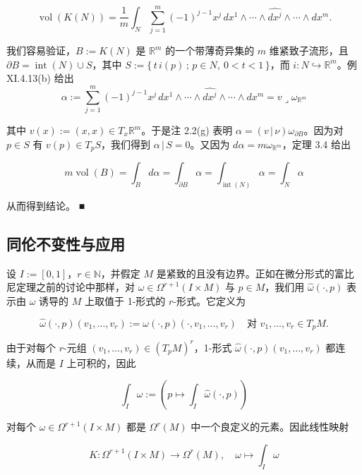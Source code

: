 \begin{example}
\begin{items}
\[
\operatorname{vol}(K(N)) = \frac{1}{m}\int_{N}\sum_{j=1}^{m}(-1)^{j-1}x^{j}\,dx^{1}\wedge\cdots\wedge\widehat{dx^{j}}\wedge\cdots\wedge dx^{m}.
\]

\proofhead
我们容易验证，$ B := K(N) $ 是 $ \mathbb{R}^m $ 的一个带薄奇异集的 $ m $ 维紧致子流形，且 $ \partial B = \operatorname{int}(N)\cup S $，其中 $ S := \{\,t\,i(p) \,;\, p\in N,\ 0 < t < 1\,\} $，而 $ i: N\hookrightarrow\mathbb{R}^m $。例 XI.4.13(b) 给出
\[
\alpha := \sum_{j=1}^{m}(-1)^{j-1}x^{j}\,dx^{1}\wedge\cdots\wedge\widehat{dx^{j}}\wedge\cdots\wedge dx^{m} = v\lrcorner\omega_{\mathbb{R}^m}
\]

其中 $ v(x) := (x,x)\in T_x\mathbb{R}^m $。于是注 2.2(g) 表明 $ \alpha = (v\,|\,\nu)\omega_{\partial B} $。因为对 $ p\in S $ 有 $ v(p)\in T_p S $，我们得到 $ \alpha\,|\,S = 0 $。又因为 $ d\alpha = m\omega_{\mathbb{R}^m} $，定理 3.4 给出

\[
m\operatorname{vol}(B) = \int_{B}d\alpha = \int_{\partial B}\alpha = \int_{\operatorname{int}(N)}\alpha = \int_{N}\alpha
\]

从而得到结论。 \nobreak\hspace{0.35em}■

\end{items}

\end{example}

\subsection*{同伦不变性与应用}

设 $ I := [0,1] $，$ r\in\mathbb{N} $，并假定 $ M $ 是紧致的且没有边界。正如在微分形式的富比尼定理之前的讨论中那样，对 $ \omega\in\Omega^{r+1}(I\times M) $ 与 $ p\in M $，我们用 $ \widehat{\omega}(\cdot,p) $ 表示由 $ \omega $ 诱导的 $ M $ 上取值于 1-形式的 $ r $-形式。它定义为

\[
\widehat{\omega}(\cdot,p)(v_1,\ldots,v_r) := \omega(\cdot,p)(\cdot,v_1,\ldots,v_r)\quad \text{对 } v_1,\ldots,v_r\in T_p M .
\]

由于对每个 $ r $-元组 $ (v_1,\ldots,v_r)\in(T_p M)^r $，1-形式 $ \widehat{\omega}(\cdot,p)(v_1,\ldots,v_r) $ 都连续，从而是 $ I $ 上可积的，因此

\[
\int_I\omega := \left(p\mapsto\int_I\widehat{\omega}(\cdot,p)\right)
\]

对每个 $ \omega\in\Omega^{r+1}(I\times M) $ 都是 $ \Omega^r(M) $ 中一个良定义的元素。因此线性映射

\begin{equation}
K : \Omega^{r+1}(I\times M)\to\Omega^r(M),\quad \omega\mapsto\int_I\omega\tag{3.15}
\end{equation}

